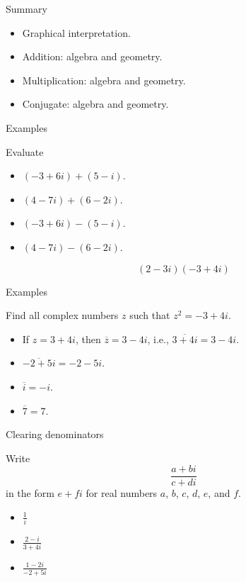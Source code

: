 \documentclass{beamer}
\begin{document}
\begin{frame}{Summary}
\begin{itemize}
	\item Graphical interpretation.
	\item Addition: algebra and geometry.
	\item Multiplication: algebra and geometry.
	\item Conjugate: algebra and geometry.
\end{itemize}
\end{frame}

\begin{frame}{Examples}
\begin{example}
Evaluate
\begin{itemize}
\item $(-3+6i) + (5-i)$.
\item $(4-7i) + (6-2i)$.
\item $(-3+6i) - (5-i)$.
\item $(4-7i) - (6-2i)$.
\end{itemize}
\end{example}
\begin{example}
\begin{equation*} 
(2-3i)(-3+4i) 
\end{equation*}
\end{example}
\end{frame}

\begin{frame}{Examples}
\begin{example}
Find all complex numbers $z$ such that $z^2 = -3+4i$.
\end{example}
\begin{example}
\begin{itemize}
\item If $z=3+4i$, then $\overline{z}= 3-4i$,
i.e., $\overline{3+4i}=3-4i$.
\item $\overline{-2+5i}= -2-5i$.
\item $\overline{i}= -i$.
\item $\overline{7}= 7$.
\end{itemize}
\end{example}
\end{frame}

\begin{frame}{Clearing denominators}
\begin{example}[Exemplar]
Write 
\begin{equation*}
\frac{a+bi}{c+di}
\end{equation*}
in the form $e+fi$ for real numbers $a$, $b$, $c$, $d$, $e$, and $f$.
\end{example}
\begin{itemize}
\item $\frac{1}{i}$ %
\item $\frac{2-i}{3+4i}$ %
\item $\frac{1-2i}{-2+5i}$ %
\end{itemize}
\end{frame}
\end{document}
